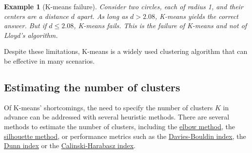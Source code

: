 \documentclass{article}[11pt]
\newtheorem{ex}{Example}
\begin{document}
\begin{ex}[K-means failure]\label{ex:kmeans-failure}
Consider two circles, each of radius 1, and their centers are a distance $d$ apart.
As long as $d > 2.08$, K-means yields the correct answer. But if $d\leq{2.08}$, K-means fails.
This is the failure of K-means and not of Lloyd's algorithm.
\end{ex}

Despite these limitations, K-means is a widely used clustering algorithm that can be effective in many scenarios.

\subsection{Estimating the number of clusters}
Of K-means' shortcomings, the need to specify the number of clusters $K$ in advance can be addressed with several heuristic methods. 
There are several methods to estimate the number of clusters, including the \href{https://en.wikipedia.org/wiki/Elbow_method_(clustering)}{elbow method}, 
the \href{https://en.wikipedia.org/wiki/Silhouette_(clustering)}{silhouette method}, or performance metrics 
such as the \href{https://en.wikipedia.org/wiki/Davies%E2%80%93Bouldin_index}{Davies-Bouldin index}, the \href{https://en.wikipedia.org/wiki/Dunn_index}{Dunn index}
or the \href{https://en.wikipedia.org/wiki/Calinski%E2%80%93Harabasz_index}{Calinski-Harabasz index}.
\end{document}
